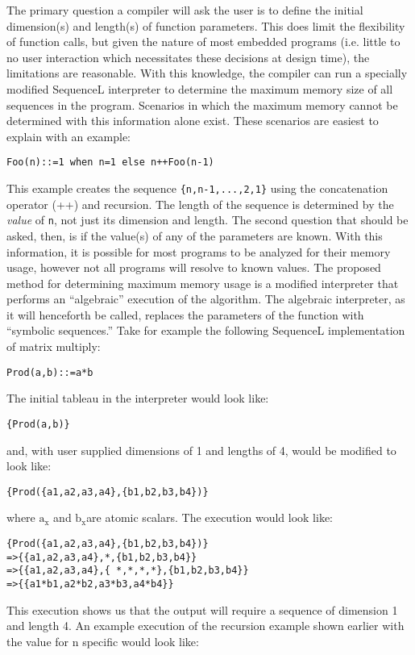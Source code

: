 The primary question a compiler will ask the user is to define the initial dimension(s) and length(s) of function parameters. This does limit the flexibility of function calls, but given the nature of most embedded programs (i.e. little to no user interaction which necessitates these decisions at design time), the limitations are reasonable. With this knowledge, the compiler can run a specially modified SequenceL interpreter to determine the maximum memory size of all sequences in the program. Scenarios in which the maximum memory cannot be determined with this information alone exist. These scenarios are easiest to explain with an example:
\begin{lstlisting}
Foo(n)::=1 when n=1 else n++Foo(n-1)
\end{lstlisting}
This example creates the sequence \lstinline${n,n-1,...,2,1}$ using the concatenation operator (++) and recursion. The length of the sequence is determined by the \emph{value} of \lstinline$n$, not just its dimension and length. The second question that should be asked, then, is if the value(s) of any of the parameters are known.  With this information, it is possible for most programs to be analyzed for their memory usage, however not all programs will resolve to known values.
The proposed method for determining maximum memory usage is a modified interpreter that performs an ``algebraic'' execution of the algorithm. The algebraic interpreter, as it will henceforth be called, replaces the parameters of the function with ``symbolic sequences.'' Take for example the following SequenceL implementation of matrix multiply:
\begin{lstlisting}
Prod(a,b)::=a*b
\end{lstlisting}
The initial tableau in the interpreter would look like:
\begin{lstlisting}
{Prod(a,b)} 
\end{lstlisting}
and, with user supplied dimensions of 1 and lengths of 4, would be modified to look like:
\begin{lstlisting}
{Prod({a1,a2,a3,a4},{b1,b2,b3,b4})}
\end{lstlisting}
where $\textrm{a}_\textrm{x}$ and $\textrm{b}_\textrm{x}$are atomic scalars. The execution would look like:
\begin{lstlisting}
{Prod({a1,a2,a3,a4},{b1,b2,b3,b4})}
=>{{a1,a2,a3,a4},*,{b1,b2,b3,b4}}
=>{{a1,a2,a3,a4},{ *,*,*,*},{b1,b2,b3,b4}}
=>{{a1*b1,a2*b2,a3*b3,a4*b4}}
\end{lstlisting}
This execution shows us that the output will require a sequence of dimension 1 and length 4. An example execution of the recursion example shown earlier with the value for n specific would look like:
